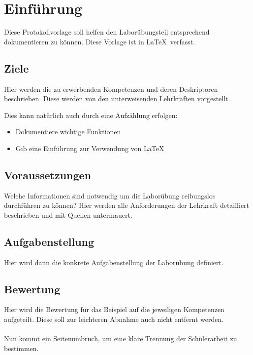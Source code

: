 
\section{Einführung}
Diese Protokollvorlage soll helfen den Laborübungsteil entsprechend dokumentieren zu können. Diese Vorlage ist in \LaTeX ~verfasst.

\subsection{Ziele}
Hier werden die zu erwerbenden Kompetenzen und deren Deskriptoren beschrieben. Diese werden von den unterweisenden Lehrkräften vorgestellt.

Dies kann natürlich auch durch eine Aufzählung erfolgen:
\begin{itemize}
	\item Dokumentiere wichtige Funktionen
	\item Gib eine Einführung zur Verwendung von \LaTeX
\end{itemize}

\subsection{Voraussetzungen}
Welche Informationen sind notwendig um die Laborübung reibungslos durchführen zu können? Hier werden alle Anforderungen der Lehrkraft detailliert beschrieben und mit Quellen untermauert.

\subsection{Aufgabenstellung}
Hier wird dann die konkrete Aufgabenstellung der Laborübung definiert.

\subsection{Bewertung}
Hier wird die Bewertung für das Beispiel auf die jeweiligen Kompetenzen aufgeteilt. Diese soll zur leichteren Abnahme auch nicht entfernt werden.
\\\\
Nun kommt ein Seitenumbruch, um eine klare Trennung der Schülerarbeit zu bestimmen.